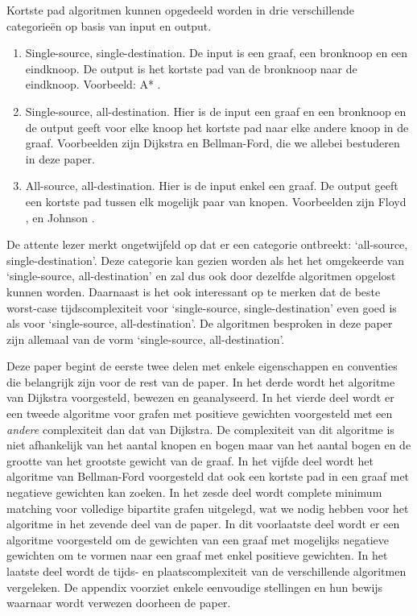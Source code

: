 \documentclass[conference]{IEEEtran}
\theoremstyle{definition}
\theoremstyle{remark}
\begin{document}
Kortste pad algoritmen kunnen opgedeeld worden in drie verschillende categorieën op basis van input en output.
\begin{enumerate}
    \item Single-source, single-destination. De input is een graaf, een bronknoop en een eindknoop. De output is het kortste pad van de bronknoop naar de eindknoop. Voorbeeld: A* \cite{A*}.
    \item Single-source, all-destination. Hier is de input een graaf en een bronknoop en de output geeft voor elke knoop het kortste pad naar elke andere knoop in de graaf. Voorbeelden zijn Dijkstra en Bellman-Ford, die we allebei bestuderen in deze paper.
    \item All-source, all-destination. Hier is de input enkel een graaf. De output geeft een kortste pad tussen elk mogelijk paar van knopen. Voorbeelden zijn Floyd \cite{Floyd}, en Johnson \cite{Johnson}.
\end{enumerate}
De attente lezer merkt ongetwijfeld op dat er een categorie ontbreekt: `all-source, single-destination'. Deze categorie kan gezien worden als het het omgekeerde van `single-source, all-destination' en zal dus ook door dezelfde algoritmen opgelost kunnen worden. Daarnaast is het ook interessant op te merken dat de beste worst-case tijdscomplexiteit voor `single-source, single-destination' even goed is als voor `single-source, all-destination'.
De algoritmen besproken in deze paper zijn allemaal van de vorm `single-source, all-destination'.

Deze paper begint de eerste twee delen met enkele eigenschappen en conventies die belangrijk zijn voor de rest van de paper.
In het derde wordt het algoritme van Dijkstra voorgesteld, bewezen en geanalyseerd.
In het vierde deel wordt er een tweede algoritme voor grafen met positieve gewichten voorgesteld met een \emph{andere} complexiteit dan dat van Dijkstra. De complexiteit van dit algoritme is niet afhankelijk van het aantal knopen en bogen maar van het aantal bogen en de grootte van het grootste gewicht van de graaf.
In het vijfde deel wordt het algoritme van Bellman-Ford voorgesteld dat ook een kortste pad in een graaf met negatieve gewichten kan zoeken.
In het zesde deel wordt complete minimum matching voor volledige bipartite grafen uitgelegd, wat we nodig hebben voor het algoritme in het zevende deel van de paper. In dit voorlaatste deel wordt er een algoritme voorgesteld om de gewichten van een graaf met mogelijks negatieve gewichten om te vormen naar een graaf met enkel positieve gewichten.
In het laatste deel wordt de tijds- en plaatscomplexiteit van de verschillende algoritmen vergeleken.
De appendix voorziet enkele eenvoudige stellingen en hun bewijs waarnaar wordt verwezen doorheen de paper.
\end{document}
